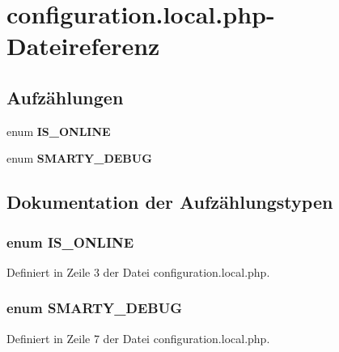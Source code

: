 \section{configuration.local.php-Dateireferenz}
\label{configuration_8local_8php}
\subsection*{Aufzählungen}
\begin{CompactItemize}
\item 
enum {\bf IS\_\-ONLINE} 
\item 
enum {\bf SMARTY\_\-DEBUG} 
\end{CompactItemize}


\subsection{Dokumentation der Aufzählungstypen}
\subsubsection{\setlength{\rightskip}{0pt plus 5cm}enum {\bf IS\_\-ONLINE}}\label{configuration_8local_8php_413df8c87e7cdc18782b5af277b8e6d7}




Definiert in Zeile 3 der Datei configuration.local.php.
\subsubsection{\setlength{\rightskip}{0pt plus 5cm}enum {\bf SMARTY\_\-DEBUG}}\label{configuration_8local_8php_886b95b1f12aacfdbc45a98920cde809}




Definiert in Zeile 7 der Datei configuration.local.php.